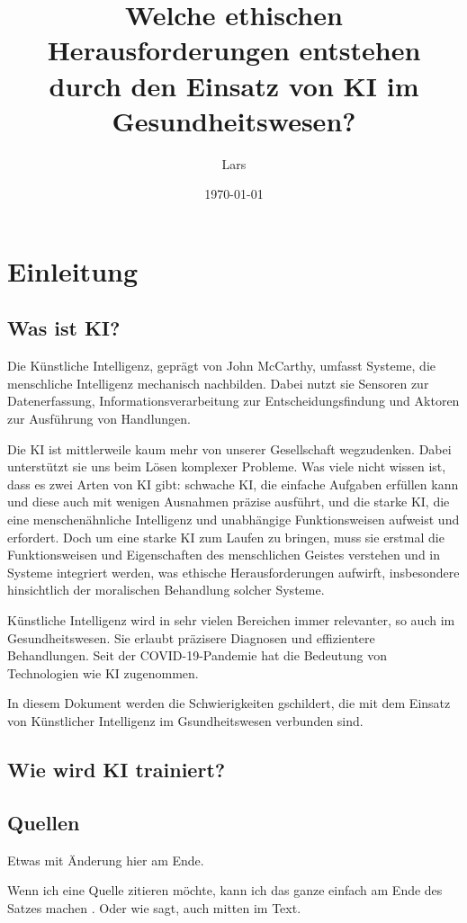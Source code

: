 \documentclass{report}
\title{Welche ethischen Herausforderungen entstehen durch den Einsatz von KI im Gesundheitswesen?}
\author{Lars}
\date{\today}
\begin{document}
\maketitle


\tableofcontents

\chapter{Einleitung}

\section{Was ist KI?}
Die Künstliche Intelligenz, geprägt von John McCarthy, umfasst Systeme, die menschliche Intelligenz mechanisch nachbilden. Dabei nutzt sie Sensoren zur Datenerfassung, Informationsverarbeitung zur Entscheidungsfindung und Aktoren zur Ausführung von Handlungen. 

\vspace{2mm}Die KI ist mittlerweile kaum mehr von unserer Gesellschaft wegzudenken. Dabei unterstützt sie uns beim Lösen komplexer Probleme. Was viele nicht wissen ist, dass es zwei Arten von KI gibt: schwache KI, die einfache Aufgaben erfüllen kann und diese auch mit wenigen Ausnahmen präzise ausführt, und die starke KI, die eine menschenähnliche Intelligenz und unabhängige Funktionsweisen aufweist und erfordert. Doch um eine starke KI zum Laufen zu bringen, muss sie erstmal die Funktionsweisen und Eigenschaften des menschlichen Geistes verstehen und in Systeme integriert werden, was ethische Herausforderungen aufwirft, insbesondere hinsichtlich der moralischen Behandlung solcher Systeme.

\vspace{2mm}Künstliche Intelligenz wird in sehr vielen Bereichen immer relevanter, so auch im Gesundheitswesen. Sie erlaubt präzisere Diagnosen und effizientere Behandlungen. Seit der COVID-19-Pandemie hat die Bedeutung von Technologien wie KI zugenommen.

\vspace{2mm}In diesem Dokument werden die Schwierigkeiten gschildert, die mit dem Einsatz von Künstlicher Intelligenz im Gsundheitswesen verbunden sind. 


\section{Wie wird KI trainiert?}




\section{Quellen}

Etwas mit Änderung hier am Ende.

Wenn ich eine Quelle zitieren möchte, kann ich das ganze einfach am Ende des Satzes machen \citep{example}. Oder wie \citet{example} sagt, auch mitten im Text.

\printbibliography
\end{document}
